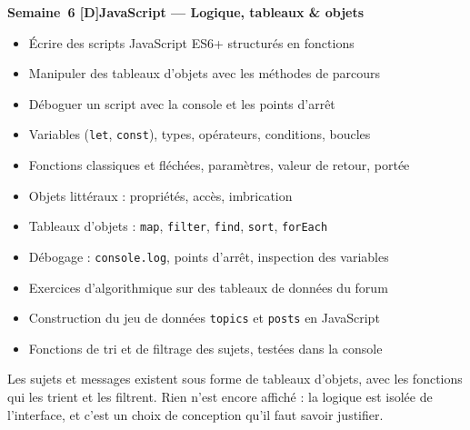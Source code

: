 \documentclass[a4paper,11pt]{article}
\newcommand{\semainetitre}[4]{%
  \needspace{9\baselineskip}%
  \vspace{8pt}
  \noindent
  \begin{tcolorbox}[
    enhanced, colback=cfptBlack, colframe=cfptBlack,
    boxrule=0pt, arc=3pt, boxsep=0pt,
    left=8pt, right=90pt, top=4pt, bottom=4pt,
    overlay={%
      \node[anchor=east, fill=cfptYellow, text=cfptBlack,
            rounded corners=2pt, inner xsep=6pt, inner ysep=3pt,
            font=\scriptsize\bfseries]
        at ([xshift=-6pt]frame.east) {#3};}
  ]
  \color{white}\bfseries\small Semaine~#1 \quad\textcolor{cfptYellow}{[#4]}\quad #2
  \end{tcolorbox}
  \vspace{-4pt}
}
\newcommand{\contenutitre}[1]{%
  \vspace{4pt}
  \noindent{\small\color{accentBlue}\textbf{#1}}\vspace{2pt}
}
\begin{document}
\semainetitre{6}{JavaScript --- Logique, tableaux \& objets}{3h cours / 4h TP}{D}
\begin{tcolorbox}[semaine]
\begin{tcolorbox}[objectifs]
\begin{itemize}
  \item Écrire des scripts JavaScript ES6+ structurés en fonctions
  \item Manipuler des tableaux d'objets avec les méthodes de parcours
  \item Déboguer un script avec la console et les points d'arrêt
\end{itemize}
\end{tcolorbox}
\vspace{4pt}
\contenutitre{Cours}
\begin{itemize}
  \item Variables (\texttt{let}, \texttt{const}), types, opérateurs, conditions, boucles
  \item Fonctions classiques et fléchées, paramètres, valeur de retour, portée
  \item Objets littéraux : propriétés, accès, imbrication
  \item Tableaux d'objets : \texttt{map}, \texttt{filter}, \texttt{find}, \texttt{sort}, \texttt{forEach}
  \item Débogage : \texttt{console.log}, points d'arrêt, inspection des variables
\end{itemize}
\contenutitre{Travaux pratiques}
\begin{itemize}
  \item Exercices d'algorithmique sur des tableaux de données du forum
  \item Construction du jeu de données \texttt{topics} et \texttt{posts} en JavaScript
  \item Fonctions de tri et de filtrage des sujets, testées dans la console
\end{itemize}
\end{tcolorbox}
\begin{tcolorbox}[filrouge={Les données du forum en mémoire}]
\small Les sujets et messages existent sous forme de tableaux d'objets, avec les fonctions qui les trient et les filtrent. Rien n'est encore affiché : la logique est isolée de l'interface, et c'est un choix de conception qu'il faut savoir justifier.
\end{tcolorbox}
\end{document}
